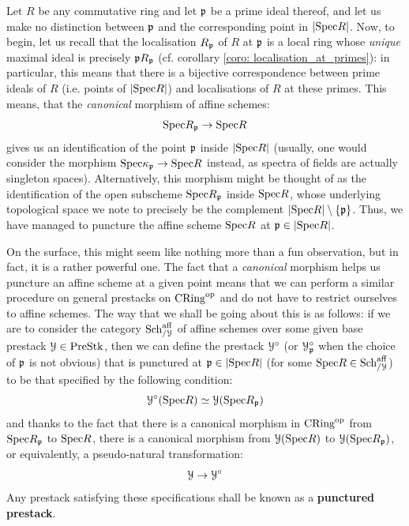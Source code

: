         \begin{example} \label{example: punctured_prestacks}
            Let $R$ be any commutative ring and let $\mathfrak{p}$ be a prime ideal thereof, and let us make no distinction between $\mathfrak{p}$ and the corresponding point in $|\mathrm{Spec} R|$. Now, to begin, let us recall that the localisation $R_{\mathfrak{p}}$ of $R$ at $\mathfrak{p}$ is a local ring whose \textit{unique} maximal ideal is precisely $\mathfrak{p} R_{\mathfrak{p}}$ (cf. corollary \ref{coro: localisation_at_primes}): in particular, this means that there is a bijective correspondence between prime ideals of $R$ (i.e. points of $|\mathrm{Spec} R|$) and localisations of $R$ at these primes. This means, that the \textit{canonical} morphism of affine schemes:
                $$\mathrm{Spec} R_{\mathfrak{p}} \to \mathrm{Spec} R$$
            gives us an identification of the point $\mathfrak{p}$ inside $|\mathrm{Spec} R|$ (usually, one would consider the morphism $\mathrm{Spec} \kappa_{\mathfrak{p}} \to \mathrm{Spec} R$ instead, as spectra of fields are actually singleton spaces). Alternatively, this morphism might be thought of as the identification of the open subscheme $\mathrm{Spec} R_{\mathfrak{p}}$ inside $\mathrm{Spec} R$, whose underlying topological space we note to precisely be the complement $|\mathrm{Spec} R| \setminus \{\mathfrak{p}\}$. Thus, we have managed to puncture the affine scheme $\mathrm{Spec} R$ at $\mathfrak{p} \in |\mathrm{Spec} R|$. 
            
            On the surface, this might seem like nothing more than a fun observation, but in fact, it is a rather powerful one. The fact that a \textit{canonical} morphism helps us puncture an affine scheme at a given point means that we can perform a similar procedure on general prestacks on $\mathrm{CRing}^{\mathrm{op}}$ and do not have to restrict ourselves to affine schemes. The way that we shall be going about this is as follows: if we are to consider the category $\mathrm{Sch}^{\mathrm{aff}}_{/\mathcal{Y}}$ of affine schemes over some given base prestack $\mathcal{Y} \in \mathrm{Pre}\mathrm{Stk}$, then we can define the prestack $\mathcal{Y}^{\circ}$ (or $\mathcal{Y}^{\circ}_{\mathfrak{p}}$ when the choice of $\mathfrak{p}$ is not obvious) that is punctured at $\mathfrak{p} \in |\mathrm{Spec} R|$ (for some $\mathrm{Spec} R \in \mathrm{Sch}^{\mathrm{aff}}_{/\mathcal{Y}}$) to be that specified by the following condition:
                $$\mathcal{Y}^{\circ}(\mathrm{Spec} R) \simeq \mathcal{Y}(\mathrm{Spec} R_{\mathfrak{p}})$$
            and thanks to the fact that there is a canonical morphism in $\mathrm{CRing}^{\mathrm{op}}$ from $\mathrm{Spec} R_{\mathfrak{p}}$ to $\mathrm{Spec} R$, there is a canonical morphism from $\mathcal{Y}(\mathrm{Spec} R)$ to $\mathcal{Y}(\mathrm{Spec} R_{\mathfrak{p}})$, or equivalently, a pseudo-natural transformation:
                $$\mathcal{Y} \to \mathcal{Y}^{\circ}$$
            Any prestack satisfying these specifications shall be known as a \textbf{punctured prestack}. 
            

\end{example}

